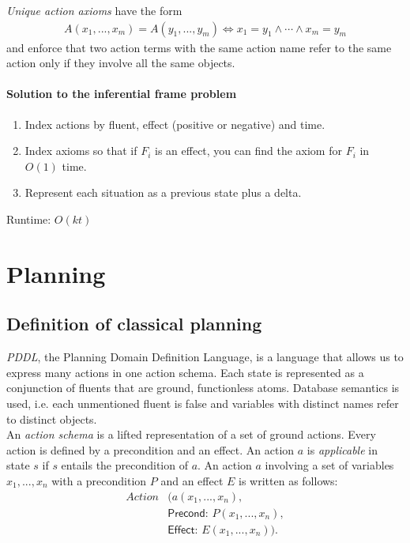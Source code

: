 \documentclass{article}
\begin{document}
\begin{definition}
	\emph{Unique action axioms} have the form
	\begin{align*}
		A(x_1,...,x_m)=A(y_1,...,y_m)\Leftrightarrow x_1 = y_1\wedge\cdots \wedge x_m=y_m
	\end{align*}
	and enforce that two action terms with the same action name refer to the
	same action only if they involve all the same objects.
\end{definition}

\paragraph{Solution to the inferential frame problem}

\begin{enumerate}
	\item Index actions by fluent, effect (positive or negative) and time.
	\item Index axioms so that if $F_i$ is an effect, you can find the axiom for $F_i$ in $O(1)$ time.
	\item Represent each situation as a previous state plus a delta.
\end{enumerate}
Runtime: $O(kt)$

\section{Planning}

\subsection{Definition of classical planning}

\begin{definition}[R\&N, p. 367]
	\emph{PDDL}, the Planning Domain Definition Language, is a language
	that allows us to express many actions in one action schema.
	Each state is represented as a conjunction of fluents that are ground,
	functionless atoms. Database semantics is used, i.e. each unmentioned
	fluent is false and variables with distinct names refer to distinct
	objects.\\
	An \emph{action schema} is a lifted representation of a set of ground
	actions. Every action is defined by a precondition and an effect. An
	action $a$ is \emph{applicable} in state $s$ if $s$ entails the precondition
	of $a$. An action $a$ involving a set of variables $x_1,...,x_n$ with
	a precondition $P$ and an effect $E$ is written as follows:
	\begin{align*}
		Action & (a(x_1, ..., x_n),                   \\
		       & \textsf{Precond: } P(x_1, ..., x_n), \\
		       & \textsf{Effect: } E(x_1, ..., x_n)).
	\end{align*}
\end{definition}
\end{document}
